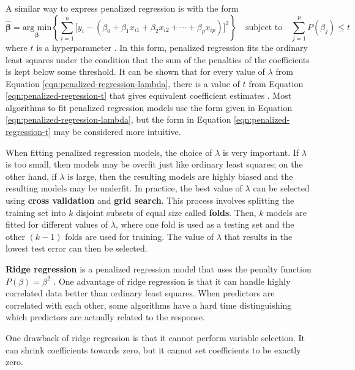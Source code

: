 \documentclass{article}
\newcommand{\argmin}[2]{\underset{#1}{\text{arg min}}\left\{#2\right\}}
\begin{document}
A similar way to express penalized regression is with the form
\begin{equation}\label{eqn:penalized-regression-t}
	\hat{\bm{\beta}} = \argmin{\bm{\beta}}{\sum\limits_{i = 1}^n \Big[y_i - (\beta_0 + \beta_1 x_{i1} + \beta_2 x_{i2} + \cdots + \beta_p x_{ip})\Big]^2} \quad \text{subject to} \quad \sum\limits_{j = 1}^p P(\beta_j)\leq t
\end{equation}
where $t$ is a hyperparameter \cite{james2013introduction, friedman2001elements}. In this form, penalized regression fits the ordinary least squares under the condition that the sum of the penalties of the coefficients is kept below some threshold. It can be shown that for every value of $\lambda$ from Equation \ref{eqn:penalized-regression-lambda}, there is a value of $t$ from Equation \ref{eqn:penalized-regression-t} that gives equivalent coefficient estimates \cite{james2013introduction}. Most algorithms to fit penalized regression models use the form given in Equation \ref{eqn:penalized-regression-lambda}, but the form in Equation \ref{eqn:penalized-regression-t} may be considered more intuitive.

When fitting penalized regression models, the choice of $\lambda$ is very important. If $\lambda$ is too small, then models may be overfit just like ordinary least squares; on the other hand, if $\lambda$ is large, then the resulting models are highly biased and the resulting models may be underfit. In practice, the best value of $\lambda$ can be selected using \textbf{cross validation} and \textbf{grid search}. This process involves splitting the training set into $k$ disjoint subsets of equal size called \textbf{folds}. Then, $k$ models are fitted for different values of $\lambda$, where one fold is used as a testing set and the other $(k - 1)$ folds are used for training. The value of $\lambda$ that results in the lowest test error can then be selected.

\textbf{Ridge regression} is a penalized regression model that uses the penalty function $P(\beta) = \beta^2$ \cite{hoerl1970ridge}. One advantage of ridge regression is that it can handle highly correlated data better than ordinary least squares. When predictors are correlated with each other, some algorithms have a hard time distinguishing which predictors are actually related to the response.

One drawback of ridge regression is that it cannot perform variable selection. It can shrink coefficients towards zero, but it cannot set coefficients to be exactly zero.
\end{document}
